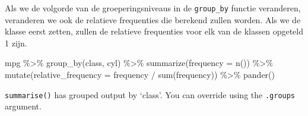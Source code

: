 \documentclass[]{tufte-book}
\newenvironment{Shaded}{}{}
\newcommand{\AttributeTok}[1]{\textcolor[rgb]{0.49,0.56,0.16}{#1}}
\newcommand{\FunctionTok}[1]{\textcolor[rgb]{0.02,0.16,0.49}{#1}}
\newcommand{\NormalTok}[1]{#1}
\newcommand{\SpecialCharTok}[1]{\textcolor[rgb]{0.25,0.44,0.63}{#1}}
\begin{document}
Als we de volgorde van de groeperingsniveaus in de \texttt{group\_by} functie veranderen, veranderen we ook de relatieve frequenties die berekend zullen worden. Als we de klasse eerst zetten, zullen de relatieve frequenties voor elk van de klassen opgeteld 1 zijn.

\begin{Shaded}
\begin{Highlighting}[]
\NormalTok{mpg }\SpecialCharTok{\%\textgreater{}\%}
  \FunctionTok{group\_by}\NormalTok{(class, cyl) }\SpecialCharTok{\%\textgreater{}\%}
  \FunctionTok{summarize}\NormalTok{(}\AttributeTok{frequency =} \FunctionTok{n}\NormalTok{()) }\SpecialCharTok{\%\textgreater{}\%}
  \FunctionTok{mutate}\NormalTok{(}\AttributeTok{relative\_frequency =}\NormalTok{ frequency }\SpecialCharTok{/} \FunctionTok{sum}\NormalTok{(frequency)) }\SpecialCharTok{\%\textgreater{}\%}
  \FunctionTok{pander}\NormalTok{()}
\end{Highlighting}
\end{Shaded}

\texttt{summarise()} has grouped output by `class'. You can override using the \texttt{.groups} argument.
\end{document}
